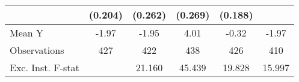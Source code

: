 {\begin{tabular}{l*{5}{c}}
            &     (0.204)         &     (0.262)         &     (0.269)         &     (0.188)         &                     \\
\midrule
Mean Y      &       -1.97         &       -1.95         &        4.01         &       -0.32         &       -1.97         \\
Observations&         427         &         422         &         438         &         426         &         410         \\
Exc. Inst. F-stat&                     &      21.160         &      45.439         &      19.828         &      15.997         \\
\bottomrule
\end{tabular}
}
